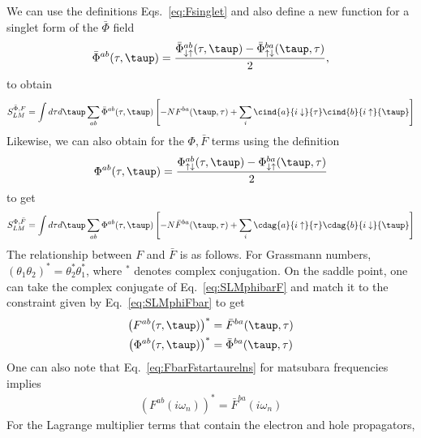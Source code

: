 We can use the definitions Eqs.~\eqref{eq:Fsinglet} and also define a new function for a singlet form of the $\bar{\Phi}$ field 
\begin{align}
    \bar{\Phi}^{ab}(\tau,\taup) = \frac{\bar{\Phi}^{ab}_{\downarrow\uparrow}(\tau,\taup) - \bar{\Phi}^{ba}_{\uparrow\downarrow}(\taup,\tau)}{2} ,
    \label{eq:phibarsinglet}
\end{align}
to obtain 
\begin{align}
    S^{\bar{\Phi},F}_{LM} = \int d\tau d\taup \sum_{ab}\bar{\Phi}^{ab}(\tau,\taup)\left[-NF^{ba}(\taup,\tau)+\sum_i\cind{a}{i\downarrow}{\tau}\cind{b}{i\uparrow}{\taup}\right]
    \label{eq:SLMphibarF}
\end{align}
Likewise, we can also obtain for the $\Phi, \bar{F}$ terms using the definition 
\begin{align}
    \Phi^{ab}(\tau,\taup) = \frac{\Phi^{ab}_{\uparrow\downarrow}(\tau,\taup) - \Phi^{ba}_{\downarrow\uparrow}(\taup,\tau)}{2}
    \label{eq:phisinglet}
\end{align}
to get 
\begin{align}
    S^{\Phi,\bar{F}}_{LM} = \int d\tau d\taup\sum_{ab}\Phi^{ab}(\tau,\taup)\left[-N \bar{F}^{ba}(\taup,\tau) + \sum_i \cdag{a}{i\uparrow}{\tau}\cdag{b}{i\downarrow}{\taup}\right]
    \label{eq:SLMphiFbar}
\end{align}
The relationship between $F$ and $\bar{F}$ is as follows. For Grassmann numbers, $(\theta_1\theta_2)^\ast = \theta_2^\ast\theta_1^\ast$, where ${}^\ast$ denotes complex conjugation.   
On the saddle point, one can take the complex conjugate of Eq.~\eqref{eq:SLMphibarF} and match it to the constraint given by Eq.~\eqref{eq:SLMphiFbar} to get 
\begin{subequations}    
\begin{align}
    \left(F^{ab}(\tau,\taup)\right)^\ast &= \bar{F}^{ba}(\taup,\tau)\label{eq:FbarFstartaurelns}\\ 
    \left(\Phi^{ab}(\tau,\taup)\right)^\ast &= \bar{\Phi}^{ba}(\taup,\tau)
\end{align}
\end{subequations}
One can also note that Eq.~\eqref{eq:FbarFstartaurelns} for matsubara frequencies implies 
\begin{align}
    \left(F^{ab}(i\omega_n)\right)^\ast = \bar{F}^{ba}(i\omega_n)
\end{align}
%
For the Lagrange multiplier terms that contain the electron and hole propagators,

